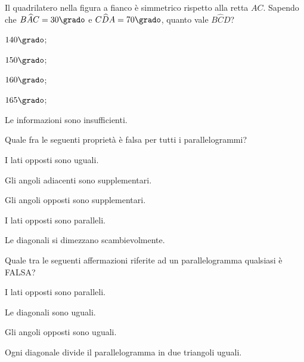 \noindent\begin{minipage}{0.6\textwidth}\parindent15pt
\begin{esercizio}
\label{ese:4.60}
Il quadrilatero nella figura a fianco è simmetrico rispetto alla 
retta $AC$.
Sapendo che $B\widehat{A}C = 30\grado$ e $C\widehat{D}A = 70\grado$, 
quanto vale $B\widehat{C}D$?
\begin{enumeratea}
\item $140\grado$;
\item $150\grado$;
\item $160\grado$;
\item $165\grado$;
\item Le informazioni sono insufficienti.
\end{enumeratea}
\end{esercizio}
\end{minipage}\hfil
\begin{minipage}{0.4\textwidth}
	\centering
\end{minipage}

\begin{esercizio}
\label{ese:4.61}
Quale fra le seguenti proprietà è falsa per tutti i parallelogrammi?
\begin{enumeratea}
\item I lati opposti sono uguali.
\item Gli angoli adiacenti sono supplementari.
\item Gli angoli opposti sono supplementari.
\item I lati opposti sono paralleli.
\item Le diagonali si dimezzano scambievolmente.
\end{enumeratea}
\end{esercizio}

\begin{esercizio}
\label{ese:4.62}
Quale tra le seguenti affermazioni riferite ad un parallelogramma 
qualsiasi è FALSA?
\begin{enumeratea}
\item I lati opposti sono paralleli.
\item Le diagonali sono uguali.
\item Gli angoli opposti sono uguali.
\item Ogni diagonale divide il parallelogramma in due triangoli 
uguali.
\end{enumeratea}
\end{esercizio}

